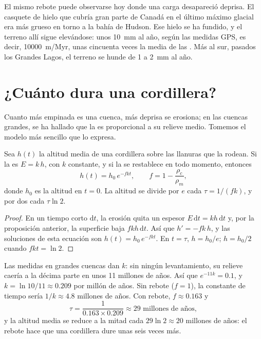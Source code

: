 El mismo rebote puede observarse hoy donde una carga desapareció deprisa. El
casquete de hielo que cubría gran parte de Canadá en el último máximo glacial
era más grueso en torno a la bahía de Hudson. Ese hielo se ha fundido, y el
terreno allí sigue elevándose: unos \qty{10}{mm} al año, según las medidas
GPS, es decir, \qty{10000}{m/Myr}, unas cincuenta veces la  media de las . Más al sur, pasados los
Grandes Lagos, el terreno se hunde de 1 a \qty{2}{mm} al año.

\section{¿Cuánto dura una cordillera?}

Cuanto más empinada es una cuenca, más deprisa se erosiona; en las cuencas
grandes, se ha hallado que la  es proporcional a su relieve
medio. Tomemos el modelo más sencillo que lo expresa.

\begin{proposition}\label{prop:g12:destruction-of-mountains:decay}
Sea $h(t)$ la altitud media de una cordillera sobre las llanuras que la
rodean. Si la  es $E = k\,h$, con $k$ constante, y si la
 se restablece en todo momento, entonces
\[
  h(t) = h_0\, e^{-f k t}, \qquad f = 1 - \frac{\rho_c}{\rho_m},
\]
donde $h_0$ es la altitud en $t = 0$. La altitud se divide por $e$ cada
$\tau = 1/(fk)$, y por dos cada $\tau \ln 2$.
\end{proposition}

\begin{proof}
En un tiempo corto $\mathrm{d}t$, la erosión quita un espesor $E\,\mathrm{d}t
= k h\,\mathrm{d}t$ y, por la proposición anterior, la superficie baja
$f k h\,\mathrm{d}t$. Así que $h' = -fk\,h$, y las soluciones de esta
ecuación son $h(t) = h_0\,e^{-fkt}$. En $t = \tau$, $h = h_0/e$; $h = h_0/2$
cuando $fkt = \ln 2$.
\end{proof}

Las medidas en grandes cuencas dan $k$: sin ningún levantamiento, su relieve
caería a la décima parte en unos 11 millones de años. Así que $e^{-11k} = 0.1$, y $k =
\ln 10/11 \approx 0.209$ por millón de años. Sin rebote ($f = 1$), la
constante de tiempo sería $1/k \approx 4.8$ millones de años. Con rebote, $f
\approx 0.163$ y
\[
  \tau = \frac{1}{0.163 \times 0.209} \approx 29 \text{ millones de años},
\]
y la altitud media se reduce a la mitad cada $29 \ln 2 \approx 20$ millones de
años: el rebote hace que una cordillera dure unas seis veces más.


